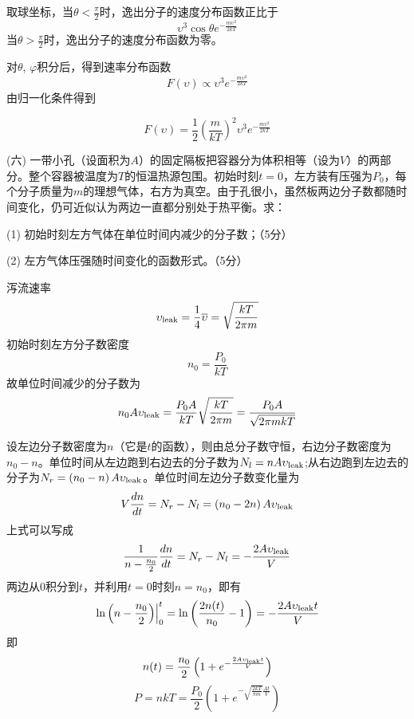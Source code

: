 \documentclass[CJK]{beamer}
\begin{document}
\begin{frame}
\bch
{\darkgreen \small
取球坐标，当$\theta<\frac{\pi}{2}$时，逸出分子的速度分布函数正比于
$$\upsilon^3 \cos\theta e^{-\frac{m\upsilon^2}{2kT}}$$
当$\theta>\frac{\pi}{2}$时，逸出分子的速度分布函数为零。

对$\theta$, $\varphi$积分后，得到速率分布函数
$$ F(\upsilon) \propto \upsilon^3 e^{-\frac{m\upsilon^2}{2kT}}$$
由归一化条件得到

$$ F(\upsilon) = \frac{1}{2} \left(\frac{m}{kT}\right)^2\upsilon^3 e^{-\frac{m\upsilon^2}{2kT}}$$

}
\ech
\end{frame}

\begin{frame}
\bch
{\blue 
(六) 一带小孔（设面积为$A$）的固定隔板把容器分为体积相等（设为$V$）的两部分。整个容器被温度为$T$的恒温热源包围。初始时刻$t=0$，左方装有压强为$P_{0}$，每个分子质量为$m$的理想气体，右方为真空。由于孔很小，虽然板两边分子数都随时间变化，仍可近似认为两边一直都分别处于热平衡。求：
\bitem
\item[(1)]{\blue 初始时刻左方气体在单位时间内减少的分子数；（5分）}
\item[(2)]{\blue 左方气体压强随时间变化的函数形式。（5分）}
\eitem
}
\ech
\end{frame}


\begin{frame}
\bch
{\darkgreen \small
泻流速率
$$\upsilon_{\rm leak} = \frac{1}{4}\overline{\upsilon} = \sqrt{\frac{kT}{2\pi m}}$$
初始时刻左方分子数密度
$$ n_0 = \frac{P_0}{kT}$$
故单位时间减少的分子数为
$$n_0 A \upsilon_{\rm leak} = \frac{P_0A}{kT}  \sqrt{\frac{kT}{2\pi m}} = \frac{P_0A}{\sqrt{2\pi m kT}}$$
}
\ech
\end{frame}

\begin{frame}
\bch
{\darkgreen \scriptsize
设左边分子数密度为$n$（它是$t$的函数），则由总分子数守恒，右边分子数密度为$n_0-n$。单位时间从左边跑到右边去的分子数为$ N_l = n A \upsilon_{\rm leak}$;从右边跑到左边去的分子为$ N_r = \left(n_0-n\right) A \upsilon_{\rm leak}$。单位时间左边分子数变化量为
$$ V\frac{dn}{dt} = N_r - N_l = \left(n_0 - 2n\right) A \upsilon_{\rm leak}$$
上式可以写成
$$ \frac{1}{n-\frac{n_0}{2}}\frac{dn}{dt} = N_r - N_l = - \frac{2A \upsilon_{\rm leak}}{V}$$
两边从$0$积分到$t$，并利用$t=0$时刻$n=n_0$，即有
$$\left.\ln\left(n-\frac{n_0}{2}\right)\right\vert_0^t=\ln\left(\frac{2n(t)}{n_0} - 1\right)  = - \frac{2A \upsilon_{\rm leak}t}{V}$$
即
$$n(t) = \frac{n_0}{2}\left(1+ e^{- \frac{2A \upsilon_{\rm leak}t}{V} }\right)$$
$$P = n kT =  \frac{P_0}{2}\left(1+ e^{- \sqrt{\frac{2 kT}{\pi m}}\frac{A t}{V}}\right)$$

}
\ech
\end{frame}
\end{document}
